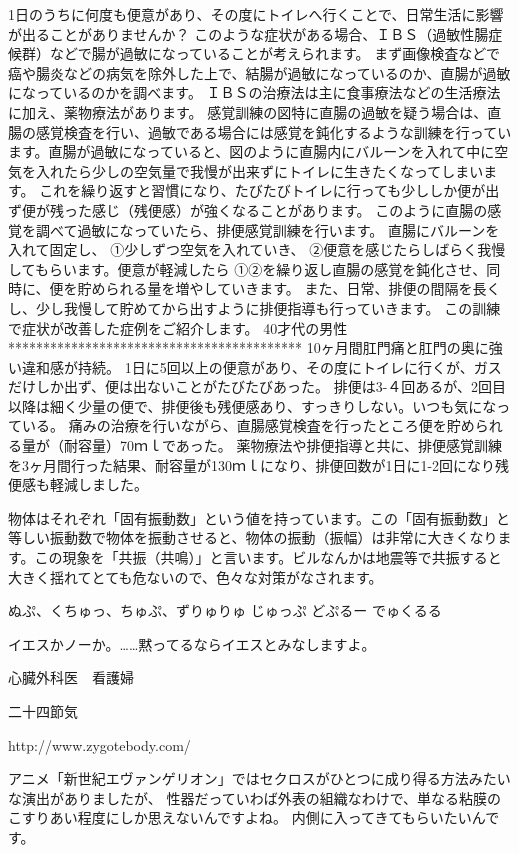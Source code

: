 1日のうちに何度も便意があり、その度にトイレへ行くことで、日常生活に影響が出ることがありませんか？
このような症状がある場合、ＩＢＳ（過敏性腸症候群）などで腸が過敏になっていることが考えられます。
まず画像検査などで癌や腸炎などの病気を除外した上で、結腸が過敏になっているのか、直腸が過敏になっているのかを調べます。
ＩＢＳの治療法は主に食事療法などの生活療法に加え、薬物療法があります。
感覚訓練の図特に直腸の過敏を疑う場合は、直腸の感覚検査を行い、過敏である場合には感覚を鈍化するような訓練を行っています。直腸が過敏になっていると、図のように直腸内にバルーンを入れて中に空気を入れたら少しの空気量で我慢が出来ずにトイレに生きたくなってしまいます。
これを繰り返すと習慣になり、たびたびトイレに行っても少ししか便が出ず便が残った感じ（残便感）が強くなることがあります。 
このように直腸の感覚を調べて過敏になっていたら、排便感覚訓練を行います。
直腸にバルーンを入れて固定し、
①少しずつ空気を入れていき、
②便意を感じたらしばらく我慢してもらいます。便意が軽減したら
①②を繰り返し直腸の感覚を鈍化させ、同時に、便を貯められる量を増やしていきます。
また、日常、排便の間隔を長くし、少し我慢して貯めてから出すように排便指導も行っていきます。
この訓練で症状が改善した症例をご紹介します。
40才代の男性
******************************************
10ヶ月間肛門痛と肛門の奥に強い違和感が持続。
1日に5回以上の便意があり、その度にトイレに行くが、ガスだけしか出ず、便は出ないことがたびたびあった。
排便は3-４回あるが、2回目以降は細く少量の便で、排便後も残便感あり、すっきりしない。いつも気になっている。
痛みの治療を行いながら、直腸感覚検査を行ったところ便を貯められる量が（耐容量）70ｍｌであった。
薬物療法や排便指導と共に、排便感覚訓練を3ヶ月間行った結果、耐容量が130ｍｌになり、排便回数が1日に1-2回になり残便感も軽減しました。 




物体はそれぞれ「固有振動数」という値を持っています。この「固有振動数」と等しい振動数で物体を振動させると、物体の振動（振幅）は非常に大きくなります。この現象を「共振（共鳴）」と言います。ビルなんかは地震等で共振すると大きく揺れてとても危ないので、色々な対策がなされます。

ぬぷ、くちゅっ、ちゅぷ、ずりゅりゅ
じゅっぷ
どぷるー
でゅくるる

イエスかノーか。……黙ってるならイエスとみなしますよ。

心臓外科医　看護婦

二十四節気

http://www.zygotebody.com/

アニメ「新世紀エヴァンゲリオン」ではセクロスがひとつに成り得る方法みたいな演出がありましたが、
性器だっていわば外表の組織なわけで、単なる粘膜のこすりあい程度にしか思えないんですよね。
内側に入ってきてもらいたいんです。

